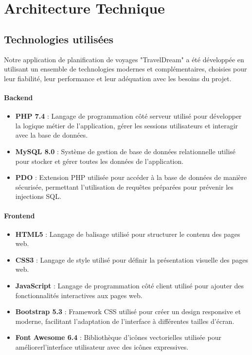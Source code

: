 \documentclass[a4paper,12pt]{article}
\begin{document}
\section{Architecture Technique}

\subsection{Technologies utilisées}
Notre application de planification de voyages "TravelDream" a été développée en utilisant un ensemble de technologies modernes et complémentaires, choisies pour leur fiabilité, leur performance et leur adéquation avec les besoins du projet.

\paragraph{Backend}
\begin{itemize}
    \item \textbf{PHP 7.4} : Langage de programmation côté serveur utilisé pour développer la logique métier de l'application, gérer les sessions utilisateurs et interagir avec la base de données.
    \item \textbf{MySQL 8.0} : Système de gestion de base de données relationnelle utilisé pour stocker et gérer toutes les données de l'application.
    \item \textbf{PDO} : Extension PHP utilisée pour accéder à la base de
données de manière sécurisée, permettant l'utilisation de requêtes préparées pour prévenir les injections SQL.
\end{itemize}

\paragraph{Frontend}
\begin{itemize}
    \item \textbf{HTML5} : Langage de balisage utilisé pour structurer le contenu des pages web.
    \item \textbf{CSS3} : Langage de style utilisé pour définir la présentation visuelle des pages web.
    \item \textbf{JavaScript} : Langage de programmation côté client utilisé pour ajouter des fonctionnalités interactives aux pages web.
    \item \textbf{Bootstrap 5.3} : Framework CSS utilisé pour créer un design responsive et moderne, facilitant l'adaptation de l'interface à différentes tailles d'écran.
    \item \textbf{Font Awesome 6.4} : Bibliothèque d'icônes vectorielles utilisée pour améliorerl'interface utilisateur avec des icônes expressives.
\end{itemize}
\end{document}

